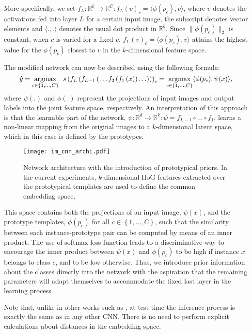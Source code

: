 \documentclass{bmvc2k}
\newcommand{\R}{\mathbb{R}}
\begin{document}
More specifically, we set $f_L : \R^k \to \R^C : f_L(v)_c = \langle\phi(p_c), v\rangle$, 
where $v$ denotes the activations fed into layer $L$ for a certain input
image, the subscript denotes vector elements and $\langle .,.\rangle$ denotes the usual dot product in $\R^k$. 
Since $\|\phi(p_c)\|_2$ is constant, when $c$ is varied for a fixed $v$,
$f_L(v)_c = \langle\phi(p_c), v\rangle$ attains the highest value for the
$\phi(p_c)$ closest to $v$ in the $k$-dimensional feature space.

The modified network can now be described using the following formula:
\begin{equation}
\hat{y}=\operatornamewithlimits{argmax}_{c \in \{1,\ldots,C\}}\enspace
s\left(f_{L}\left(f_{L-1}\left(\ldots
f_{2}\left(f_{1}\left(x\right)\right)\ldots\right)\right)\right)_c =
\operatornamewithlimits{argmax}_{c\in\{1,\ldots,C\}} \langle\phi(p_c),
\psi(x)\rangle,
\label{eq:CNN2}
\end{equation}
where $\psi(.)$ and $\phi(.)$ represent the projections of input images and
output labels into the joint feature space, respectively. An interpretation of this approach is that 
the learnable part of the network,
$\psi : \R^{d} \to \R^{k}: \psi=f_{L-1}\circ\ldots\circ f_{1}$,
learns a non-linear mapping from the original images to a $k$-dimensional
latent space, which in this case is defined by the prototypes. 
\begin{figure}
  \centering
  \texttt{[image: im\_cnn\_archi.pdf]}
\caption{\label{fig:network_arch}Network architecture with the introduction
  of prototypical priors. In the current experiments, $k$-dimensional HoG
  features extracted over the prototypical templates are used to define the
  common embedding space.}
\end{figure}
This space contains both the projections of an input image, $\psi(x)$, and the
prototype templates, $\phi(p_{c})$ for all $c\in\left\{ 1,\ldots ,C\right\} $,
such that the similarity between each instance-prototype pair can be computed by means of an inner product.
The use of softmax-loss function leads to a discriminative way to encourage the inner product 
between $\psi(x)$ and $\phi(p_{c})$ to be high if instance $x$ belongs to class
$c$, and to be low otherwise. Thus, we introduce prior
information about the classes directly into the network with the aspiration that the remaining parameters
will adapt themselves to accommodate the fixed last layer in the learning process.


Note that, unlike in other works such as \cite{pala_geoff2009zsl,norouzi2013zero}, at test
time the inference process is exactly the same as in any other CNN. There is no need to 
perform explicit calculations about distances in the embedding space.
\end{document}
